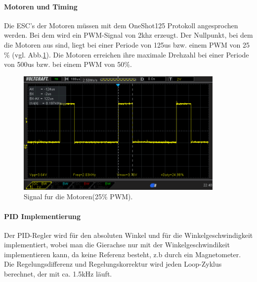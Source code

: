 \documentclass[12pt,a4paper, ngerman]{article}
\begin{document}
\paragraph{Motoren und Timing}
Die ESC's der Motoren müssen mit dem OneShot125 Protokoll\cite{website:OL_OneShot125} angesprochen werden. Bei dem wird ein PWM-Signal von 2khz erzeugt. Der Nullpunkt, bei dem die Motoren aus sind, liegt bei einer Periode von 125us bzw. einem PWM von 25$\%$ (vgl. Abb.\ref{pwm}). Die Motoren erreichen ihre maximale Drehzahl bei einer Periode von 500us bzw. bei einem PWM von 50$\%$.
\begin{figure}[h]
\centering
\includegraphics[width=0.9\textwidth]{PWM_25.png}
\caption[Eigenes Bild]{Signal fur die Motoren(25$\%$ PWM).}\label{pwm}
\end{figure}
\paragraph{PID Implementierung}
Der PID-Regler wird für den absoluten Winkel und für die Winkelgeschwindigkeit implementiert, wobei man die Gierachse nur mit der Winkelgeschwindikeit implementieren kann, da keine Referenz besteht, z.b durch ein Magnetometer. Die Regelungsdifferenz und Regelungskorrektur wird jeden Loop-Zyklus berechnet, der mit ca. 1.5kHz läuft.
\newpage
\end{document}
